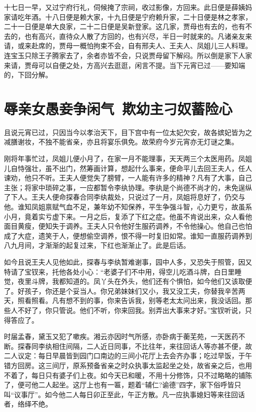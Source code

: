 \documentclass[12pt,oneside]{book}
\begin{document}
十七日一早，又过宁府行礼，伺候掩了宗祠，收过影像，方回来。此日便是薛姨妈家请吃年酒。十八日便是赖大家，十九日便是宁府赖升家，二十日便是林之孝家，二十一日便是单大良家，二十二日便是吴新登家。这几家，贾母也有去的，也有不去的，也有高兴，直待众人散了方回的，也有兴尽，半日一时就来的。凡诸亲友来请，或来赴席的，贾母一概怕拘束不会，自有邢夫人、王夫人、凤姐儿三人料理。连宝玉只除王子腾家去了，余者亦皆不会，只说贾母留下解闷。所以倒是家下人家来请，贾母可以自便之处，方高兴去逛逛，闲言不提。当下元宵已过——要知端的，下回分解。



\chapter{辱亲女愚妾争闲气~欺幼主刁奴蓄险心}
且说元宵已过，只因当今以孝治天下，目下宫中有一位太妃欠安，故各嫔妃皆为之减膳谢妆，不独不能省亲，亦且将宴乐俱免。故荣府今岁元宵亦无灯谜之集。

刚将年事忙过，凤姐儿便小月了，在家一月不能理事，天天两三个太医用药。凤姐儿自恃强壮，虽不出门，然筹画计算，想起什么事来，便命平儿去回王夫人，任人谏劝，他只不听。王夫人便觉失了膀臂，一人能有许多的精神？凡有了大事，自己主张；将家中琐碎之事，一应都暂令李纨协理。李纨是个尚德不尚才的，未免逞纵了下人。王夫人便命探春合同李纨裁处，只说过了一月，凤姐将息好了，仍交与他。谁知凤姐禀赋气血不足，兼年幼不知保养，平生争强斗智，心力更亏，故虽系小月，竟着实亏虚下来。一月之后，复添了下红之症。他虽不肯说出来，众人看他面目黄瘦，便知失于调养。王夫人只令他好生服药调养，不令他操心。他自己也怕成了大症，遗笑于人，便想偷空调养，恨不得一时复旧如常。谁知一直服药调养到八九月间，才渐渐的起复过来，下红也渐渐止了。此是后话。

如今且说王夫人见他如此，探春与李纨暂难谢事，园中人多，又恐失于照管，因又特请了宝钗来，托他各处小心：“老婆子们不中用，得空儿吃酒斗牌，白日里睡觉，夜里斗牌，我都知道的。凤丫头在外头，他们还有个惧怕，如今他们又该取便了。好孩子，你还是个妥当人。你兄弟妹妹们又小，我又没工夫，你替我辛苦两天，照看照看。凡有想不到的事，你来告诉我，别等老太太问出来，我没话回。那些人不好了，你只管说。他们不听，你来回我。别弄出大事来才好。”宝钗听说，只得答应了。

时届孟春，黛玉又犯了嗽疾。湘云亦因时气所感，亦卧病于蘅芜苑，一天医药不断。探春同李纨相住间隔，二人近日同事，不比往年，来往回话人等亦甚不便，故二人议定：每日早晨皆到园门口南边的三间小花厅上去会齐办事；吃过早饭，于午错方回房。这三间厅，原系预备省亲之时众执事太监起坐之处，故省亲之后，也用不着了，每日只有婆子们上夜。如今天已和暖，不用十分修饰，只不过略略的铺陈了，便可他二人起坐。这厅上也有一匾，题着“辅仁?谕德”四字，家下俗呼皆只叫“议事厅”。如今他二人每日卯正至此，午正方散。凡一应执事媳妇等来往回话者，络绎不绝。
\end{document}
